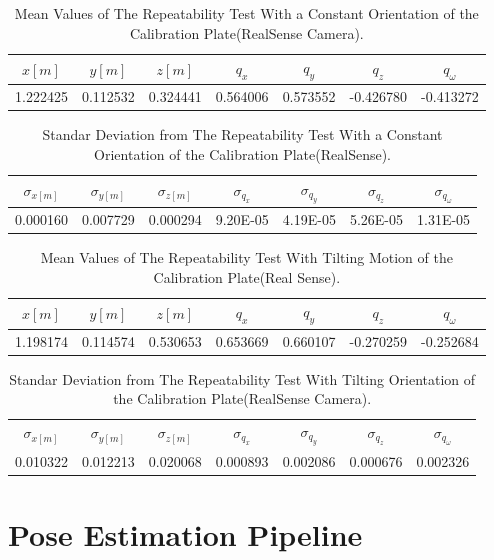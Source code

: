\begin{table}[b]
\renewcommand{\arraystretch}{1.3}
\caption{Mean Values of The Repeatability Test With a Constant Orientation of the Calibration Plate(RealSense Camera).}
\label{real1}
\centering
\begin{tabular}{|c||c||c||c||c||c||c|}
\hline
$x[m]$ & $y[m]$ & $z[m]$ & $q_{x}$ & $q_{y}$ & $q_{z}$ &$q_{\omega}$ \\
\hline
1.222425&	0.112532&	0.324441&0.564006&	0.573552&	-0.426780&	-0.413272 \\
\hline
\hline
\end{tabular}
\end{table}


\begin{table}[b]
\renewcommand{\arraystretch}{1.3}
\caption{Standar Deviation from The Repeatability Test With a Constant Orientation of the Calibration Plate(RealSense).}
\label{real1}
\centering
\begin{tabular}{|c||c||c||c||c||c||c|}
\hline
$\sigma_{x[m]}$ & $\sigma_{y[m]}$ & $\sigma_{z[m]}$ & $\sigma_{q_{x}}$ & $\sigma_{q_{y}}$ & $\sigma_{q_{z}}$ &$\sigma_{q_{\omega}}$ \\
\hline
0.000160&	0.007729&	0.000294&9.20E-05&	4.19E-05&	5.26E-05&	1.31E-05\\
\hline
\hline
\end{tabular}
\end{table}


\begin{table}[b]
\renewcommand{\arraystretch}{1.3}
\caption{Mean Values of The Repeatability Test With Tilting Motion of the Calibration Plate(Real Sense).}
\label{real1}
\centering
\begin{tabular}{|c||c||c||c||c||c||c|}
\hline
$x[m]$ & $y[m]$ & $z[m]$ & $q_{x}$ & $q_{y}$ & $q_{z}$ &$q_{\omega}$ \\
\hline
1.198174&	0.114574&	0.530653& 0.653669&	0.660107&-0.270259&	-0.252684 \\
\hline
\hline
\end{tabular}
\end{table}

\begin{table}[b]
\renewcommand{\arraystretch}{1.3}
\caption{Standar Deviation from The Repeatability Test With Tilting Orientation of the Calibration Plate(RealSense Camera).}
\label{real1}
\centering
\begin{tabular}{|c||c||c||c||c||c||c|}
\hline
$\sigma_{x[m]}$ & $\sigma_{y[m]}$ & $\sigma_{z[m]}$ & $\sigma_{q_{x}}$ & $\sigma_{q_{y}}$ & $\sigma_{q_{z}}$ &$\sigma_{q_{\omega}}$ \\
0.010322&	0.012213&	0.020068&			0.000893&	0.002086&	0.000676&	0.002326\\
\hline
\hline
\end{tabular}
\end{table}



\section{Pose Estimation Pipeline}

